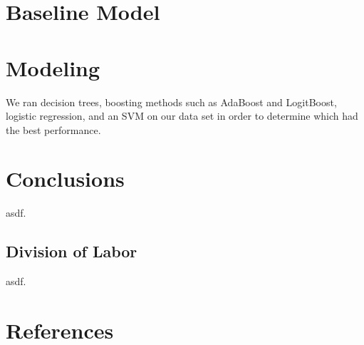 \documentclass[11pt]{amsart}
\begin{document}
\section{Baseline Model}


\section{Modeling}

We ran decision trees, boosting methods such as AdaBoost and LogitBoost, logistic regression, and an SVM on our data set in order to determine which had the best performance. 

\section{Conclusions}
asdf.

\subsection{Division of Labor}
asdf.

\section{References}
\end{document}
